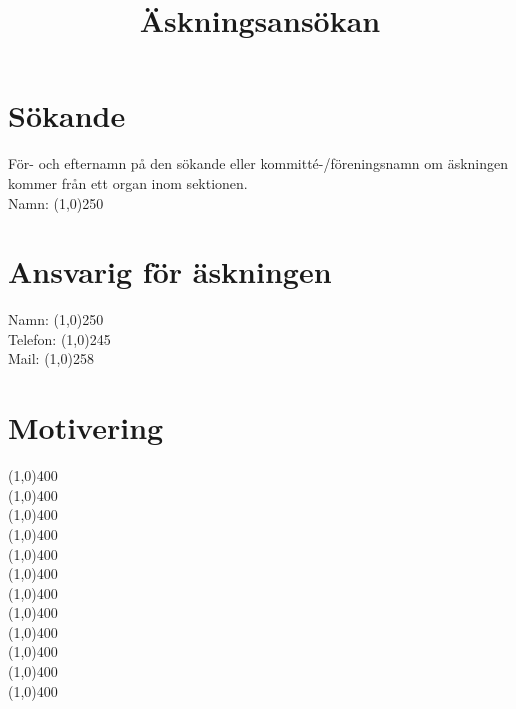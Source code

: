 \documentclass[11pt, includeaddress]{../../classes/cthit}
\begin{document}
\title{Äskningsansökan}

\makeheadfoot%

\section*{Sökande}
För- och efternamn på den sökande eller kommitté-/föreningsnamn om äskningen kommer från ett organ inom sektionen. \\[14pt]
Namn: \line(1,0){250} 

\section*{Ansvarig för äskningen}

Namn: \line(1,0){250} \\[14pt]
Telefon: \line(1,0){245} \\[14pt]
Mail: \line(1,0){258}

\section*{Motivering}
\line(1,0){400} \\[14pt]
\line(1,0){400} \\[14pt]
\line(1,0){400} \\[14pt]
\line(1,0){400} \\[14pt]
\line(1,0){400} \\[14pt]
\line(1,0){400} \\[14pt]
\line(1,0){400} \\[14pt]
\line(1,0){400} \\[14pt]
\line(1,0){400} \\[14pt]
\line(1,0){400} \\[14pt]
\line(1,0){400} \\[14pt]
\line(1,0){400} \\[14pt]

\newpage

\setlength{\extrarowheight}{12pt}
\end{document}
